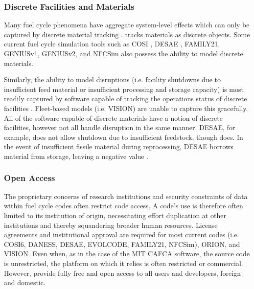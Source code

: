 
\subsubsection{Discrete Facilities and Materials}

Many fuel cycle phenomena have aggregate system-level effects which can only be
captured by discrete material tracking \cite{huff_next_2010}.  \Cyclus
tracks materials as discrete objects. Some current fuel cycle simulation tools
such as \gls{COSI}
\cite{mccarthy_benchmark_2012,grasso_nea-wpfc/fcts_2009,guerin_benchmark_2009},
\gls{DESAE}
\cite{andrianova_desae_2008}, FAMILY21\cite{mccarthy_benchmark_2012},
\gls{GENIUSv1}, \gls{GENIUSv2}, and \gls{NFCSim} also possess the ability to
model discrete materials.

Similarly, the ability to model disruptions (i.e. facility shutdowns due to
insufficient feed material or insufficient processing and storage capacity) is
most readily captured by software capable of tracking the operations status of
discrete facilities \cite{huff_next_2010}.  Fleet-based models (i.e.
\gls{VISION}) are unable to capture this gracefully.  All of the software
capable of discrete materials have a notion of discrete facilities, however not
all handle disruption in the same manner. \gls{DESAE}, for example, does not
allow shutdown due to insufficient feedstock, though \Cyclus does. In the event
of insufficient fissile material during reprocessing, \gls{DESAE} borrows
material from storage, leaving a negative value \cite{mccarthy_benchmark_2012}.

\subsubsection{Open Access}

The proprietary concerns of research institutions and security constraints of
data within fuel cycle codes often restrict code access. A code's use is
therefore often limited to its institution of origin, necessitating effort
duplication at other institutions and thereby squandering broader human
resources. License agreements and institutional approval are required for most
current codes (i.e. \gls{COSI}6, \gls{DANESS}, \gls{DESAE}, EVOLCODE,
FAMILY21, \gls{NFCSim})\cite{juchau_modeling_2010}, ORION, and VISION.  Even when, as in
the case of the MIT \gls{CAFCA} software, the source code is unrestricted, the
platform on which it relies is often restricted or commercial.  However, \Cyclus
provide fully free and open access to all users
and developers, foreign and domestic.

